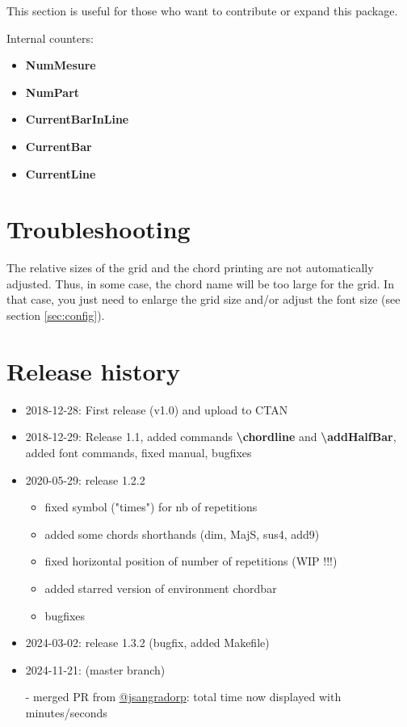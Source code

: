 \documentclass[11pt]{article}
\newcommand{\btt}{\bfseries \ttfamily }
\newcommand{\tbs}{\textbackslash{}}
\begin{document}
This section is useful for those who want to contribute or expand this package.

Internal counters:

\begin{itemize}
\item {\btt NumMesure}
\item {\btt NumPart}
\item {\btt CurrentBarInLine}
\item {\btt CurrentBar}
\item {\btt CurrentLine}
\end{itemize}

\section{Troubleshooting}

The relative sizes of the grid and the chord printing are not automatically adjusted.
Thus, in some case, the chord name will be too large for the grid.
In that case, you just need to enlarge the grid size and/or adjust the font size (see section \ref {sec:config}).

\section{Release history}

\begin{itemize}
\item 2018-12-28: First release (v1.0) and upload to CTAN

\item 2018-12-29: Release 1.1, added commands {\btt \tbs chordline} and {\btt \tbs addHalfBar}, added font commands, fixed manual, bugfixes

\item 2020-05-29: release 1.2.2
\begin{itemize}
\item fixed symbol ("times") for nb of repetitions
\item added some chords shorthands (dim, MajS, sus4, add9)
\item fixed horizontal position of number of repetitions (WIP !!!)
\item added starred version of environment chordbar
\item bugfixes
\end{itemize}

\item 2024-03-02: release 1.3.2 (bugfix, added Makefile)

\item 2024-11-21: (master branch)

- merged PR from \href{https://github.com/skramm/chordbars/pull/1}{@jsangradorp}:
 total time now displayed with minutes/seconds
\end{itemize}
\end{document}
